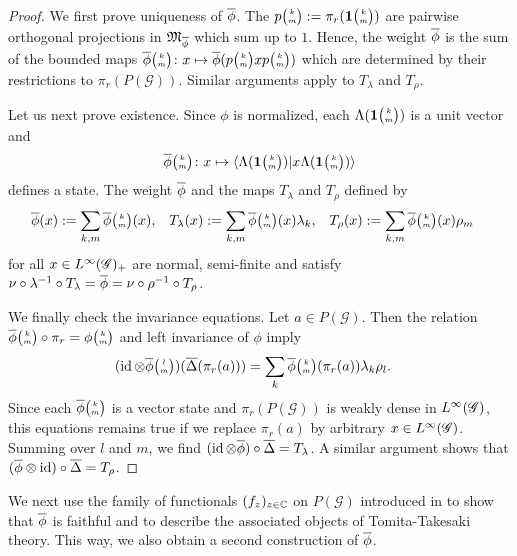 \begin{proof}
  We first prove uniqueness of $\overline{\phi}$.  The
  $p{\tiny {\begin{pmatrix} k\\m\end{pmatrix}}}:=\pi_{r}(\mathbf{1}{\tiny {\begin{pmatrix} k\\m\end{pmatrix}}})$ are pairwise orthogonal
  projections in $\mathfrak{M}_{\overline{\phi}}$ which sum up to $1$. Hence, the
  weight $\overline{\phi}$ is the sum of the bounded maps
  $\overline{\phi}{\tiny {\begin{pmatrix} k\\m\end{pmatrix}}} \colon x \mapsto
  \overline{\phi}(p{\tiny {\begin{pmatrix} k\\m\end{pmatrix}}}xp{\tiny {\begin{pmatrix} k\\m\end{pmatrix}}})$ which are determined
  by their restrictions to $\pi_{r}(P(\mathscr{G}))$. Similar
  arguments apply to $T_{\lambda}$ and $T_{\rho}$.

Let us next prove existence.  Since $\phi$ is normalized,   each
$\Lambda(\mathbf{1}{\tiny {\begin{pmatrix} k\\m\end{pmatrix}}})$ is a unit vector and
\begin{align*}
  \overline{\phi}{\tiny {\begin{pmatrix} k\\m\end{pmatrix}}} \colon x \mapsto \langle \Lambda(\mathbf{1}{\tiny {\begin{pmatrix} k\\m\end{pmatrix}}})|x \Lambda(\mathbf{1}{\tiny {\begin{pmatrix} k\\m\end{pmatrix}}})\rangle
\end{align*}
defines a state. The weight $\overline{\phi}$ and the maps $T_{\lambda}$ and $T_{\rho}$
defined by
\begin{align} \label{eq:vn-weights}
  \overline{\phi}(x) &:= \sum_{k,m} \overline{\phi}{\tiny {\begin{pmatrix} k\\m\end{pmatrix}}}(x), &
    T_{\lambda}(x)&:= \sum_{k,m}
\overline{\phi}{\tiny {\begin{pmatrix} k\\m\end{pmatrix}}}(x)\lambda_{k}, & 
T_{\rho}(x)&:=
    \sum_{k,m} \overline{\phi}{\tiny {\begin{pmatrix} k\\m\end{pmatrix}}}(x)\rho_{m}
\end{align}
for all $x\in L^{\infty}(\mathscr{G})_{+}$  are normal, semi-finite and satisfy $\nu
\circ \lambda^{-1} \circ T_{\lambda} = \overline{\phi} = \nu \circ \rho^{-1}
\circ T_{\rho}$.

We finally check the invariance equations.  Let $a \in
P(\mathscr{G})$.  Then the relation $\overline{\phi}{\tiny {\begin{pmatrix} k\\m\end{pmatrix}}}\circ \pi_{r} = \phi{\tiny {\begin{pmatrix} k\\m\end{pmatrix}}}$
and left invariance of $\phi$ imply
  \begin{align*}
    (\operatorname{id} \otimes \overline{\phi}{\tiny {\begin{pmatrix} l\\m\end{pmatrix}}})(\overline{\Delta}(\pi_{r}(a))) &= \sum_{k}
    \overline{\phi}{\tiny {\begin{pmatrix} k\\m\end{pmatrix}}}(\pi_{r}(a)) \lambda_{k}\rho_{l}.
  \end{align*}
  Since each $\overline{\phi}{\tiny {\begin{pmatrix} k\\m\end{pmatrix}}}$ is a vector state and $\pi_{r}(P(\mathscr{G}))$ is
  weakly dense in $L^{\infty}(\mathscr{G})$,  this equations
  remains true if we replace $\pi_{r}(a)$ by arbitrary $x\in
  L^{\infty}(\mathscr{G})$. Summing over $l$ and $m$, we  find $(\operatorname{id} \otimes \overline{\phi})
  \circ \overline{\Delta} = T_{\lambda}$. A similar argument shows that
  $(\overline{\phi} \otimes \operatorname{id}) \circ \overline{\Delta}=T_{\rho}$.
\end{proof}

We next use the family of functionals $(f_{z})_{z \in \mathbb{C}}$ on
$P(\mathscr{G})$ introduced in \cite[Theorem 3.49]{DCT1} to show that
$\overline{\phi}$ is faithful and to describe the associated objects of
Tomita-Takesaki theory. This way, we  also obtain a second construction of
$\overline{\phi}$. 

